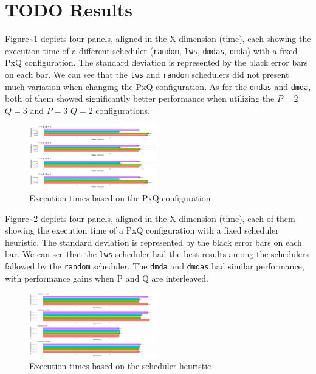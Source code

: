 \documentclass[conference, 10pt, final]{IEEEtran}
\begin{document}
\section{{\bfseries\sffamily TODO} Results}
\label{sec:results}
Figure\textasciitilde{}\ref{fig:timePQ} depicts four panels, aligned in the X dimension (time), each showing the execution time of a different scheduler (\verb|random|, \verb|lws|, \verb|dmdas|, \verb|dmda|) with a fixed PxQ configuration. The standard deviation is represented by the black error bars on each bar. We can see that the \verb|lws| and \verb|random| schedulers did not present much variation when changing the PxQ configuration. As for the \verb|dmdas| and \verb|dmda|, both of them showed significantly better performance when utilizing the \(P=2\) \(Q=3\) and \(P=3\) \(Q=2\) configurations.

\begin{figure}[ht]
\centering
\includegraphics[width=0.5\textwidth]{tempo_medio_com_desvio_padrao_por_PQ.png}
\caption{Execution times based on the PxQ configuration}
\label{fig:timePQ}
\end{figure}

Figure\textasciitilde{}\ref{fig:timeSched} depicts four panels, aligned in the X dimension (time), each of them showing the execution time of a PxQ configuration with a fixed scheduler heuristic. The standard deviation is represented by the black error bars on each bar. We can see that the \verb|lws| scheduler had the best results among the schedulers fallowed by the \verb|random| scheduler. The \verb|dmda| and \verb|dmdas| had similar performance, with performance gains when P and Q are interleaved.

\begin{figure}[ht]
\centering
\includegraphics[width=0.5\textwidth]{tempo_medio_com_desvio_padrao_por_scheduler.png}
\caption{Execution times based on the scheduler heuristic}
\label{fig:timeSched}
\end{figure}
\end{document}
